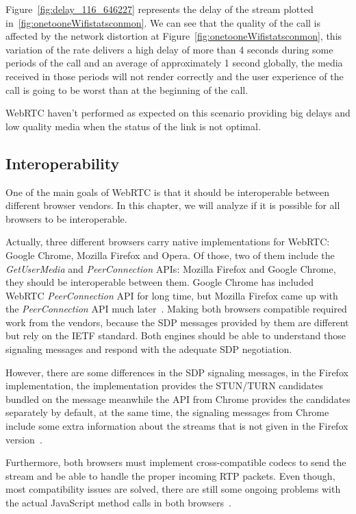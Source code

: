 Figure~\ref{fig:delay_116_646227} represents the delay of the stream plotted in~\ref{fig:onetooneWifistatsconmon}. We can see that the quality of the call is affected by the network distortion at Figure~\ref{fig:onetooneWifistatsconmon}, this variation of the rate delivers a high delay of more than 4 seconds during some periods of the call and an average of approximately 1 second globally, the media received in those periods will not render correctly and the user experience of the call is going to be worst than at the beginning of the call.

WebRTC haven't performed as expected on this scenario providing big delays and low quality media when the status of the link is not optimal.

\subsection{Interoperability}

One of the main goals of WebRTC is that it should be interoperable between different browser vendors. In this chapter, we will analyze if it is possible for all browsers to be interoperable.

Actually, three different browsers carry native implementations for WebRTC: Google Chrome, Mozilla Firefox and Opera. Of those, two of them include the {\it GetUserMedia} and {\it PeerConnection} APIs: Mozilla Firefox and Google Chrome, they should be interoperable between them. Google Chrome has included WebRTC {\it PeerConnection} API for long time, but Mozilla Firefox came up with the {\it PeerConnection} API much later~\cite{chromefirefoxinterop}. Making both browsers compatible required work from the vendors, because the SDP messages provided by them are different but rely on the IETF standard. Both engines should be able to understand those signaling messages and respond with the adequate SDP negotiation.

However, there are some differences in the SDP signaling messages, in the Firefox implementation, the implementation provides the STUN/TURN candidates bundled on the message meanwhile the API from Chrome provides the candidates separately by default, at the same time, the signaling messages from Chrome include some extra information about the streams that is not given in the Firefox version~\cite{interopnotes}.

Furthermore, both browsers must implement cross-compatible codecs to send the stream and be able to handle the proper incoming RTP packets. Even though, most compatibility issues are solved, there are still some ongoing problems with the actual JavaScript method calls in both browsers~\cite{interopnotes}.

